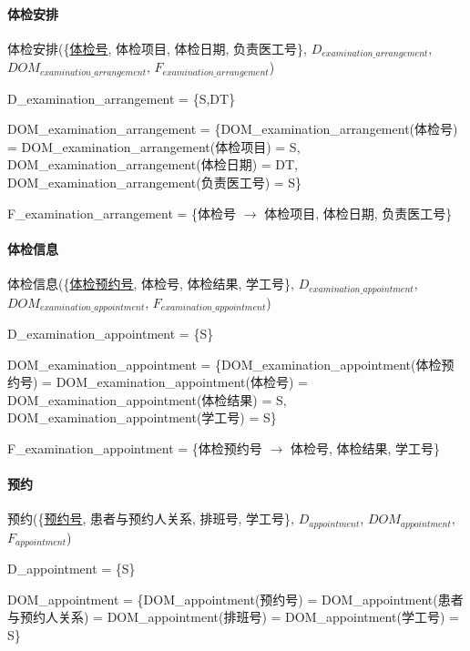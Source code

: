 \documentclass{article}
\begin{document}
\paragraph{体检安排}

体检安排(\{\underline{体检号}, 体检项目, 体检日期, 负责医工号\}, $D_{examination\_arrangement}$, \newline$DOM_{examination\_arrangement}$, $F_{examination\_arrangement}$)

D\_examination\_arrangement = \{S,DT\}

DOM\_examination\_arrangement = \{DOM\_examination\_arrangement(体检号) = \newline DOM\_examination\_arrangement(体检项目) = S, \newline DOM\_examination\_arrangement(体检日期) = DT, DOM\_examination\_arrangement(负责医工号) = S\}

F\_examination\_arrangement = \{体检号 $\rightarrow$ 体检项目, 体检日期, 负责医工号\}

\paragraph{体检信息}

体检信息(\{\underline{体检预约号}, 体检号, 体检结果, 学工号\}, $D_{examination\_appointment}$, \newline $DOM_{examination\_appointment}$, $F_{examination\_appointment}$)

D\_examination\_appointment = \{S\}

DOM\_examination\_appointment = \{DOM\_examination\_appointment(体检预约号) = \newline DOM\_examination\_appointment(体检号) = \newline DOM\_examination\_appointment(体检结果) = S, DOM\_examination\_appointment(学工号) = S\}

F\_examination\_appointment = \{体检预约号 $\rightarrow$ 体检号, 体检结果, 学工号\}

\paragraph{预约}

预约(\{\underline{预约号}, 患者与预约人关系, 排班号, 学工号\}, $D_{appointment}$, $DOM_{appointment}$, $F_{appointment}$)

D\_appointment = \{S\}

DOM\_appointment = \{DOM\_appointment(预约号) = DOM\_appointment(患者与预约人关系) = \newline DOM\_appointment(排班号) = DOM\_appointment(学工号) = S\}
\end{document}
